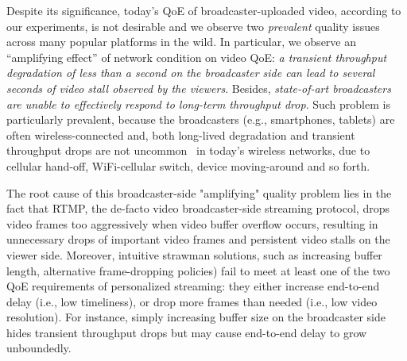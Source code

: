 %
%

Despite its significance, today's QoE of broadcaster-uploaded video,
according to our experiments, is not desirable and we observe two {\em prevalent}
quality issues across many popular platforms in the wild.
In particular, we observe an ``amplifying effect'' of network
condition on video QoE: {\em a transient throughput degradation
of less than a second on the broadcaster side can lead to
several seconds of video stall observed by the viewers}. Besides, {\em state-of-art broadcasters are unable to effectively respond to long-term throughput drop}.
Such problem is particularly prevalent, because the broadcasters
(e.g., smartphones, tablets) are often wireless-connected and, both
long-lived degradation and transient throughput drops are not
uncommon~\cite{some-paper-to-show-this}  in today's wireless networks,
due to cellular hand-off, WiFi-cellular
switch, device moving-around and so forth.


The root cause of this broadcaster-side "amplifying" quality problem
lies in the fact that RTMP, the de-facto video broadcaster-side streaming protocol,
drops video frames too aggressively when video buffer overflow
occurs, resulting in unnecessary drops of important video frames and
persistent video stalls on the viewer side.
Moreover, intuitive strawman solutions, such as increasing
buffer length, alternative frame-dropping policies) fail to meet at least one
of the two QoE requirements of personalized streaming:
they either increase end-to-end delay (i.e., low timeliness), or drop more
frames than needed (i.e., low video resolution).
For instance, simply increasing buffer size on the broadcaster
side hides transient throughput drops but may cause end-to-end
delay to grow unboundedly.

